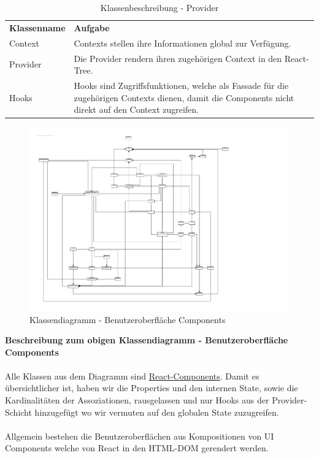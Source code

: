 \begin{table}[H]
	\centering
	\begin{tabularx}{\textwidth}{X X}
		\rowcolor[HTML]{C0C0C0} 
		\textbf{Klassenname} & \textbf{Aufgabe} \\
		Context & Contexts stellen ihre Informationen global zur Verfügung.  \\
		\rowcolor[HTML]{E7E7E7} 
		Provider & Die Provider rendern ihren zugehörigen Context in den React-Tree. \\
		Hooks & Hooks sind Zugriffsfunktionen, welche als Fassade für die zugehörigen Contexts dienen, damit die Components nicht direkt auf den Context zugreifen. \\
	\end{tabularx}
	\caption{Klassenbeschreibung - Provider}
	\label{table:klassenbeschreibung-provider}
\end{table}
\newpage

\begin{figure}[H]
	\hspace{-3cm}
	\includegraphics[scale = 0.9]{./img/diagrams/web-class}
	\caption{Klassendiagramm - Benutzeroberfläche Components}
\end{figure}
\newpage

\noindent \textbf{Beschreibung zum obigen Klassendiagramm - Benutzeroberfläche Components} \\ \\
Alle Klassen aus dem Diagramm sind \href{https://reactjs.org/docs/components-and-props.html}{React-Components}. Damit es übersichtlicher ist, haben wir die Properties und den internen State, sowie die Kardinalitäten der Assoziationen, rausgelassen und nur Hooks aus der Provider-Schicht hinzugefügt wo wir vermuten auf den globalen State zuzugreifen. \\ \\
Allgemein bestehen die Benutzeroberflächen aus Kompositionen von UI Components welche von React in den HTML-DOM gerendert werden. 
 
